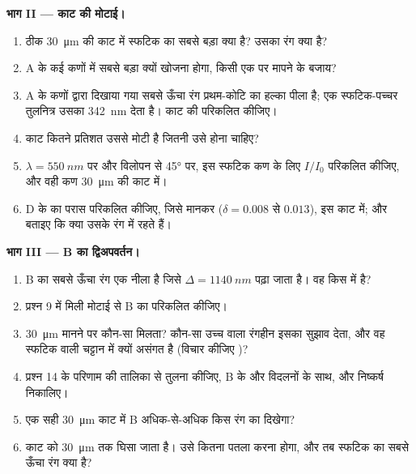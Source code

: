 \begin{problem}
\medskip
\noindent\textbf{भाग II --- काट की मोटाई।}
\begin{enumerate}[resume]
  \item ठीक \qty{30}{\micro m} की काट में स्फटिक का सबसे बड़ा  क्या है? उसका रंग क्या है?
  \item A के कई कणों में सबसे बड़ा  क्यों खोजना होगा, किसी एक पर मापने के बजाय?
  \item A के कणों द्वारा दिखाया गया सबसे ऊँचा रंग प्रथम-कोटि का हल्का पीला है; एक स्फटिक-पच्चर तुलनित्र उसका  \qty{342}{nm} देता
        है। काट की  परिकलित कीजिए।
  \item काट कितने प्रतिशत उससे मोटी है जितनी उसे होना चाहिए?
  \item $\lambda = \qty{550}{nm}$ पर और विलोपन से \ang{45} पर, इस स्फटिक कण के लिए $I/I_0$ परिकलित कीजिए, और वही कण
        \qty{30}{\micro m} की काट में।
  \item D के  का परास परिकलित कीजिए, जिसे  मानकर ($\delta = 0.008$ से $0.013$), इस काट में; और बताइए कि
        क्या उसके रंग  में रहते हैं।
\end{enumerate}

\medskip
\noindent\textbf{भाग III --- B का द्विअपवर्तन।}
\begin{enumerate}[resume]
  \item B का सबसे ऊँचा रंग एक नीला है जिसे $\Delta = \qty{1140}{nm}$ पढ़ा जाता है। वह किस  में है?
  \item प्रश्न 9 में मिली मोटाई से B का  परिकलित कीजिए।
  \item \qty{30}{\micro m} मानने पर कौन-सा  मिलता? कौन-सा उच्च  वाला रंगहीन  इसका सुझाव देता, और वह स्फटिक
        वाली चट्टान में क्यों असंगत है (विचार कीजिए )?
  \item प्रश्न 14 के परिणाम की तालिका से तुलना कीजिए, B के  और विदलनों के साथ, और निष्कर्ष निकालिए।
  \item एक सही \qty{30}{\micro m} काट में B अधिक-से-अधिक किस रंग का दिखेगा?
  \item काट को \qty{30}{\micro m} तक घिसा जाता है। उसे कितना पतला करना होगा, और तब स्फटिक का सबसे ऊँचा रंग क्या है?
\end{enumerate}


\end{problem}

